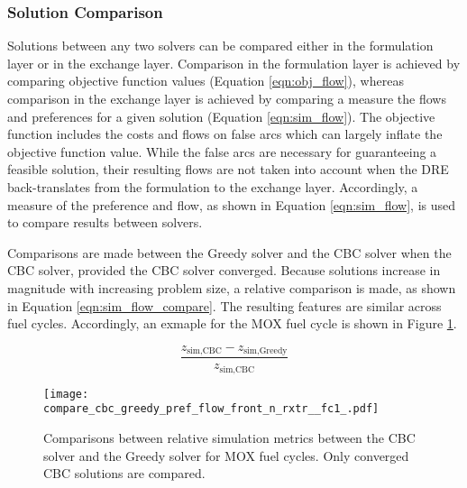 
\subsubsection{Solution Comparison}\label{sec:res:scale:front:soln}

Solutions between any two solvers can be compared either in the formulation
layer or in the exchange layer. Comparison in the formulation layer is achieved
by comparing objective function values (Equation \ref{eqn:obj_flow}), whereas
comparison in the exchange layer is achieved by comparing a measure the flows
and preferences for a given solution (Equation \ref{eqn:sim_flow}). The
objective function includes the costs and flows on false arcs which can largely
inflate the objective function value. While the false arcs are necessary for
guaranteeing a feasible solution, their resulting flows are not taken into
account when the DRE back-translates from the formulation to the exchange
layer. Accordingly, a measure of the preference and flow, as shown in Equation
\ref{eqn:sim_flow}, is used to compare results between solvers. 


Comparisons are made between the Greedy solver and the CBC solver when the CBC
solver, provided the CBC solver converged. Because solutions increase in
magnitude with increasing problem size, a relative comparison is made, as shown
in Equation \ref{eqn:sim_flow_compare}. The resulting features are similar
across fuel cycles. Accordingly, an exmaple for the MOX fuel cycle is shown in
Figure \ref{fig:compare_cbc_greedy_pref_flow_front_n_rxtr__fc1_}.

\begin{equation}\label{eqn:sim_flow_compare}
\frac{z_{\text{sim}, \text{CBC}} - z_{\text{sim}, \text{Greedy}}}
     {z_{\text{sim}, \text{CBC}}} 
\end{equation}

\begin{figure}[h!]
  \begin{center}
    \texttt{[image: compare\_cbc\_greedy\_pref\_flow\_front\_n\_rxtr\_\_fc1\_.pdf]}
    \caption[]{
      \label{fig:compare_cbc_greedy_pref_flow_front_n_rxtr__fc1_}
      Comparisons between relative simulation metrics between the CBC solver and
      the Greedy solver for MOX fuel cycles. Only converged CBC
      solutions are compared.  }
  \end{center}
\end{figure}

